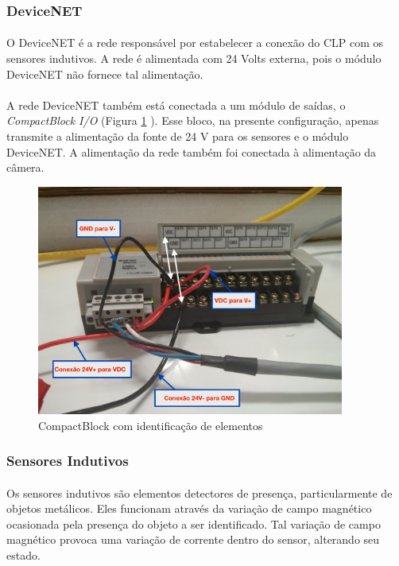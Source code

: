\documentclass[a4paper,11pt]{scrartcl} %
\numberwithin{equation}{section} %
\numberwithin{figure}{section} %
\numberwithin{table}{section} %
\begin{document}
\subsubsection{DeviceNET}
\paragraph{} O DeviceNET é a rede responsável por estabelecer a conexão do CLP com os sensores indutivos. A rede é alimentada com 24 Volts externa, pois o módulo DeviceNET não fornece tal alimentação.
\paragraph{} A rede DeviceNET também está conectada a um módulo de saídas, o \textit{CompactBlock I/O} (Figura \ref{CBcomentado} ). Esse bloco, na presente configuração, apenas transmite a alimentação da fonte de 24 V para os sensores e o módulo DeviceNET. A alimentação da rede também foi conectada à alimentação da câmera.

\begin{figure}[!ht]
  \centering
    \includegraphics[width=0.9\textwidth]{figures/hardware/COMPACTBLOCK.jpg}
    \caption{CompactBlock com identificação de elementos\label{CBcomentado}}
\end{figure}

\subsubsection{Sensores Indutivos}
\paragraph{} Os sensores indutivos são elementos detectores de presença, particularmente de objetos metálicos. Eles funcionam através da variação de campo magnético ocasionada pela presença do objeto a ser identificado. Tal variação de campo magnético provoca uma variação de corrente dentro do sensor, alterando seu estado.
\end{document}
